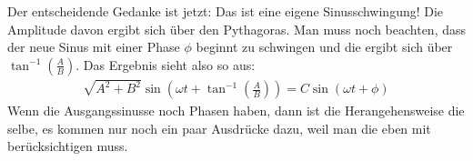 \documentclass[paper=a4,10pt]{scrartcl}
\begin{document}
\noindent
Der entscheidende Gedanke ist jetzt: Das ist eine eigene Sinusschwingung! Die Amplitude davon ergibt sich über den Pythagoras. Man muss noch beachten, dass der neue Sinus mit einer Phase $\phi$ beginnt zu schwingen und die ergibt sich über $\tan^{-1}(\frac{A}{B})$. Das Ergebnis sieht also so aus:
\begin{align}
\sqrt{A^2 + B^2} \sin \left(\omega t + \tan^{-1}\left( \frac{A}{B} \right) \right) = C \sin(\omega t + \phi)
\end{align}
Wenn die Ausgangssinusse noch Phasen haben, dann ist die Herangehensweise die selbe, es kommen nur noch ein paar Ausdrücke dazu, weil man die eben mit berücksichtigen muss.
\end{document}
